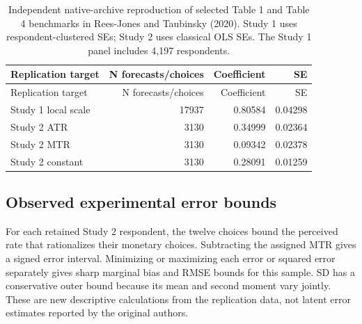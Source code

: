 \documentclass[
  11pt,
  letterpaper,
  DIV=11,
  numbers=noendperiod]{scrartcl}
\begin{document}
\begin{longtable}[]{@{}lrrr@{}}
\caption{Independent native-archive reproduction of selected Table 1 and
Table 4 benchmarks in Rees-Jones and Taubinsky (2020). Study 1 uses
respondent-clustered SEs; Study 2 uses classical OLS SEs. The Study 1
panel includes 4,197
respondents.}\label{tbl-empirical-benchmarks}\tabularnewline
\toprule\noalign{}
Replication target & N forecasts/choices & Coefficient & SE \\
\midrule\noalign{}
\endfirsthead
\toprule\noalign{}
Replication target & N forecasts/choices & Coefficient & SE \\
\midrule\noalign{}
\endhead
\bottomrule\noalign{}
\endlastfoot
Study 1 local scale & 17937 & 0.80584 & 0.04298 \\
Study 2 ATR & 3130 & 0.34999 & 0.02364 \\
Study 2 MTR & 3130 & 0.09342 & 0.02378 \\
Study 2 constant & 3130 & 0.28091 & 0.01259 \\
\end{longtable}

\subsection{Observed experimental error
bounds}\label{observed-experimental-error-bounds}

For each retained Study 2 respondent, the twelve choices bound the
perceived rate that rationalizes their monetary choices. Subtracting the
assigned MTR gives a signed error interval. Minimizing or maximizing
each error or squared error separately gives sharp marginal bias and
RMSE bounds for this sample. SD has a conservative outer bound because
its mean and second moment vary jointly. These are new descriptive
calculations from the replication data, not latent error estimates
reported by the original authors.
\end{document}

